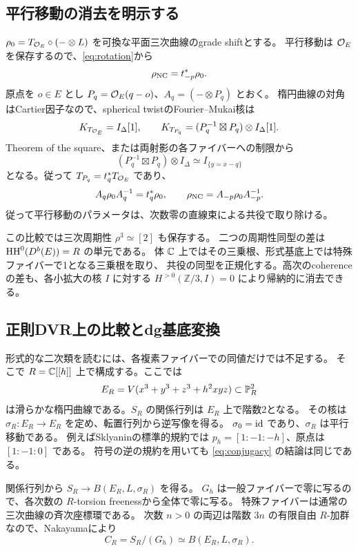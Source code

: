 \subsection{平行移動の消去を明示する}

$\rho_0=T_{\mathcal O_E}\circ(-\otimes L)$ を可換な平面三次曲線のgrade shiftとする。
平行移動は $\mathcal O_E$ を保存するので、\eqref{eq:rotation}から
\[
 \rho_{\operatorname{NC}}=t_{-p}^*\rho_0.
\]
原点を $o\in E$ とし $P_q=\mathcal O_E(q-o)$、$A_q=(-\otimes P_q)$ とおく。
楕円曲線の対角はCartier因子なので、spherical twistのFourier--Mukai核は
\[
 K_{T_{\mathcal O_E}}=I_\Delta[1],\qquad
 K_{T_{P_q}}=(P_q^{-1}\boxtimes P_q)\otimes I_\Delta[1].
\]
Theorem of the square、または両射影の各ファイバーへの制限から
\[
 (P_q^{-1}\boxtimes P_q)\otimes I_\Delta
 \simeq I_{\{y=x-q\}}
\]
となる。従って $T_{P_q}=t_q^*T_{\mathcal O_E}$ であり、
\begin{equation}\label{eq:conjugacy}
 A_q\rho_0A_q^{-1}=t_q^*\rho_0,
 \qquad \rho_{\operatorname{NC}}=A_{-p}\rho_0A_{-p}^{-1}.
\end{equation}
従って平行移動のパラメータは、次数零の直線束による共役で取り除ける。

この比較では三次周期性 $\rho^3\simeq[2]$ も保存する。
二つの周期性同型の差は $\operatorname{HH}^0(D^b(E))=R$ の単元である。
体 $\mathbb C$ 上ではその三乗根、形式基底上では特殊ファイバーで1となる三乗根を取り、
共役の同型を正規化する。高次のcoherenceの差も、各小拡大の核 $I$ に対する
$H^{>0}(\mathbb Z/3,I)=0$ により帰納的に消去できる。

\subsection{正則DVR上の比較とdg基底変換}

形式的な二次類を読むには、各複素ファイバーでの同値だけでは不足する。
そこで $R=\mathbb C[[h]]$ 上で構成する。ここでは
\[
 E_R=V(x^3+y^3+z^3+h^2xyz)\subset\mathbb P^2_R
\]
は滑らかな楕円曲線である。$S_R$ の関係行列は $E_R$ 上で階数2となる。
その核は $\sigma_R:E_R\to E_R$ を定め、転置行列から逆写像を得る。
$\sigma_0=\operatorname{id}$ であり、$\sigma_R$ は平行移動である。
例えばSklyaninの標準的規約では $p_h=[1:-1:-h]$、原点は $[1:-1:0]$ である。
符号の逆の規約を用いても \eqref{eq:conjugacy} の結論は同じである。

関係行列から $S_R\to B(E_R,L,\sigma_R)$ を得る。
$G_h$ は一般ファイバーで零に写るので、各次数の $R$-torsion freenessから全体で零に写る。
特殊ファイバーは通常の三次曲線の斉次座標環である。
次数 $n>0$ の両辺は階数 $3n$ の有限自由 $R$-加群なので、Nakayamaにより
\begin{equation}\label{eq:relative-thcr}
 C_R=S_R/(G_h)\simeq B(E_R,L,\sigma_R).
\end{equation}

